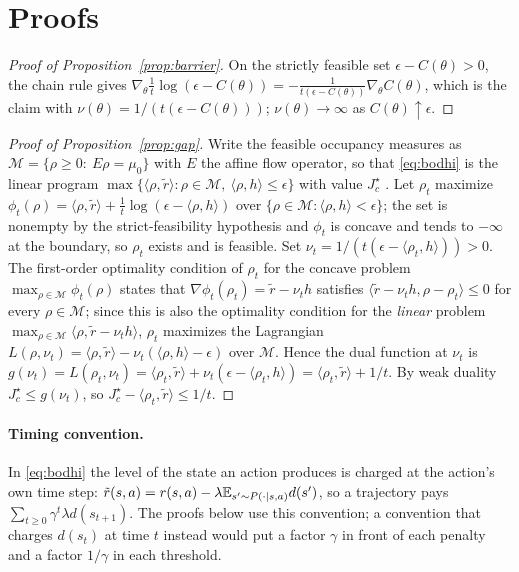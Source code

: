 \section{Proofs}
\label{app:proofs}

\begin{proof}[Proof of Proposition~\ref{prop:barrier}]
On the strictly feasible set $\epsilon-C(\theta)>0$, the chain rule gives $\nabla_\theta\tfrac1t\log(\epsilon-C(\theta))=-\tfrac{1}{t(\epsilon-C(\theta))}\nabla_\theta C(\theta)$, which is the claim with $\nu(\theta)=1/(t(\epsilon-C(\theta)))$; $\nu(\theta)\to\infty$ as $C(\theta)\uparrow\epsilon$.
\end{proof}

\begin{proof}[Proof of Proposition~\ref{prop:gap}]
Write the feasible occupancy measures as $\mathcal M=\{\rho\ge0:\ E\rho=\mu_0\}$ with $E$ the affine flow operator, so that \eqref{eq:bodhi} is the linear program $\max\{\langle\rho,\tilde r\rangle:\rho\in\mathcal M,\ \langle\rho,h\rangle\le\epsilon\}$ with value $J^\star_c$ \cite{altman1999cmdp}.
Let $\rho_t$ maximize $\phi_t(\rho)=\langle\rho,\tilde r\rangle+\tfrac1t\log(\epsilon-\langle\rho,h\rangle)$ over $\{\rho\in\mathcal M:\langle\rho,h\rangle<\epsilon\}$; the set is nonempty by the strict-feasibility hypothesis and $\phi_t$ is concave and tends to $-\infty$ at the boundary, so $\rho_t$ exists and is feasible.
Set $\nu_t=1/(t(\epsilon-\langle\rho_t,h\rangle))>0$.
The first-order optimality condition of $\rho_t$ for the concave problem $\max_{\rho\in\mathcal M}\phi_t(\rho)$ states that $\nabla\phi_t(\rho_t)=\tilde r-\nu_t h$ satisfies $\langle\tilde r-\nu_t h,\rho-\rho_t\rangle\le0$ for every $\rho\in\mathcal M$; since this is also the optimality condition for the \emph{linear} problem $\max_{\rho\in\mathcal M}\langle\rho,\tilde r-\nu_t h\rangle$, $\rho_t$ maximizes the Lagrangian $L(\rho,\nu_t)=\langle\rho,\tilde r\rangle-\nu_t(\langle\rho,h\rangle-\epsilon)$ over $\mathcal M$.
Hence the dual function at $\nu_t$ is $g(\nu_t)=L(\rho_t,\nu_t)=\langle\rho_t,\tilde r\rangle+\nu_t(\epsilon-\langle\rho_t,h\rangle)=\langle\rho_t,\tilde r\rangle+1/t$.
By weak duality $J^\star_c\le g(\nu_t)$, so $J^\star_c-\langle\rho_t,\tilde r\rangle\le1/t$.
\end{proof}

\paragraph{Timing convention.}
In \eqref{eq:bodhi} the level of the state an action produces is charged at the action's own time step: $\tilde r(s,a)=r(s,a)-\lambda\mathbb{E}_{s'\sim P(\cdot\mid s,a)}d(s')$, so a trajectory pays $\sum_{t\ge0}\gamma^t\lambda d(s_{t+1})$.
The proofs below use this convention; a convention that charges $d(s_t)$ at time $t$ instead would put a factor $\gamma$ in front of each penalty and a factor $1/\gamma$ in each threshold.

